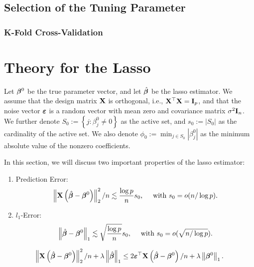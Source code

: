 \subsection{Selection of the Tuning Parameter}

\subsubsection{K-Fold Cross-Validation}

\section{Theory for the Lasso}

Let $\boldsymbol{\beta}^{0}$ be the true parameter vector, and let $\hat{\boldsymbol{\beta}}$ be the lasso estimator. We assume that the design matrix ${\bf X}$ is orthogonal, i.e., ${\bf X}^{\top}{\bf X}={\bf I}_{p}$, and that the noise vector $\boldsymbol{\varepsilon}$ is a random vector with mean zero and covariance matrix $\sigma^{2}{\bf I}_{n}$.
We further denote $S_{0}:=\left\{j:\beta_{j}^{0}\neq 0\right\}$ as the active set, and $s_{0}:=\left|S_{0}\right|$ as the cardinality of the active set. We also denote $\phi_{0}:=\min_{j\in S_{0}}\left|\beta_{j}^{0}\right|$ as the minimum absolute value of the nonzero coefficients.

In this section, we will discuss two important properties of the lasso estimator:
\begin{enumerate}
	\item Prediction Error:
	      \begin{equation*}
		      \left\|{\bf X}\left(\hat{\boldsymbol{\beta}}-\boldsymbol{\beta}^{0}\right)\right\|_{2}^{2}/n\lesssim \frac{\log p}{n}s_{0}, \quad\ \text{with}\ s_{0}=o(n/\log p).
	      \end{equation*}
	\item $l_{1}$-Error:
	      \begin{equation*}
		      \left\|\hat{\boldsymbol{\beta}}-\boldsymbol{\beta}^{0}\right\|_{1}\lesssim\sqrt{\frac{\log p}{n}}s_{0}, \quad\ \text{with}\ s_{0}=o(\sqrt{n/\log p}).
	      \end{equation*}
\end{enumerate}

\begin{lemma}
	\label{lem:basic-inequality}
	\begin{equation*}
		\left\|{\bf X}\left(\hat{\boldsymbol{\beta}}-\boldsymbol{\beta}^{0}\right)\right\|_{2}^{2}/n+\lambda\left\|\hat{\boldsymbol{\beta}}\right\|_{1}\leq 2\boldsymbol{\varepsilon}^{\top}{\bf X}\left(\hat{\boldsymbol{\beta}}-\boldsymbol{\beta}^{0}\right)/n+\lambda\left\|\boldsymbol{\beta}^{0}\right\|_{1}.
	\end{equation*}
\end{lemma}

